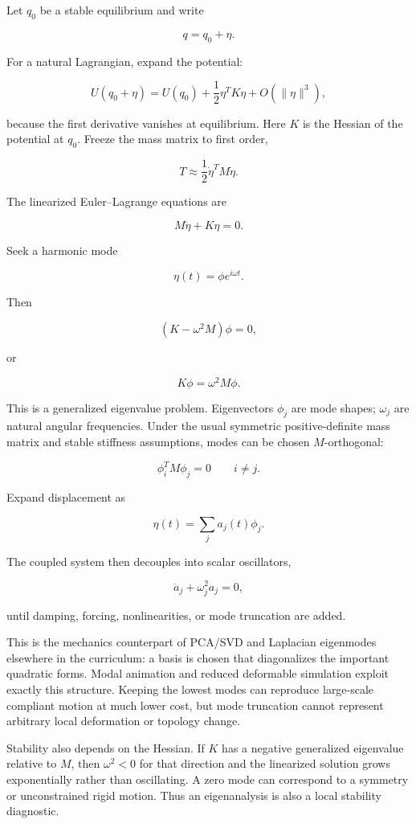 Let \(q_0\) be a stable equilibrium and write

\[
q=q_0+\eta.
\]

For a natural Lagrangian, expand the potential:

\[
U(q_0+\eta)
=
U(q_0)
+
\frac12\eta^T K\eta
+
O(\|\eta\|^3),
\]

because the first derivative vanishes at equilibrium. Here \(K\) is the Hessian of the potential at \(q_0\). Freeze the mass matrix to first order,

\[
T
\approx
\frac12\dot\eta^T M\dot\eta.
\]

The linearized Euler--Lagrange equations are

\[
M\ddot\eta+K\eta=0.
\]

Seek a harmonic mode

\[
\eta(t)=\phi e^{i\omega t}.
\]

Then

\[
(K-\omega^2M)\phi=0,
\]

or

\[
\boxed{
K\phi=\omega^2M\phi.
}
\]

This is a generalized eigenvalue problem. Eigenvectors \(\phi_j\) are mode shapes; \(\omega_j\) are natural angular frequencies. Under the usual symmetric positive-definite mass matrix and stable stiffness assumptions, modes can be chosen \(M\)-orthogonal:

\[
\phi_i^T M\phi_j=0
\qquad i\neq j.
\]

Expand displacement as

\[
\eta(t)=\sum_j a_j(t)\phi_j.
\]

The coupled system then decouples into scalar oscillators,

\[
\ddot a_j+\omega_j^2a_j=0,
\]

until damping, forcing, nonlinearities, or mode truncation are added.

This is the mechanics counterpart of PCA/SVD and Laplacian eigenmodes elsewhere in the curriculum: a basis is chosen that diagonalizes the important quadratic forms. Modal animation and reduced deformable simulation exploit exactly this structure. Keeping the lowest modes can reproduce large-scale compliant motion at much lower cost, but mode truncation cannot represent arbitrary local deformation or topology change.

Stability also depends on the Hessian. If \(K\) has a negative generalized eigenvalue relative to \(M\), then \(\omega^2<0\) for that direction and the linearized solution grows exponentially rather than oscillating. A zero mode can correspond to a symmetry or unconstrained rigid motion. Thus an eigenanalysis is also a local stability diagnostic.

